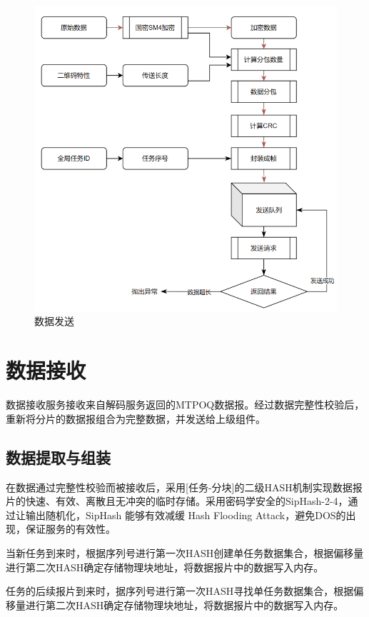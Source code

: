 \begin{figure}[!htbp]
\centering
\includegraphics[scale=1.2]{figures/QR_Enc_Flow.png}
\caption{数据发送}
\end{figure}

\section{数据接收}

数据接收服务接收来自解码服务返回的MTPOQ数据报。经过数据完整性校验后，重新将分片的数据报组合为完整数据，并发送给上级组件。

\subsection{数据提取与组装}

在数据通过完整性校验而被接收后，采用[任务-分块]的二级HASH机制实现数据报片的快速、有效、离散且无冲突的临时存储。采用密码学安全的SipHash-2-4，通过让输出随机化，SipHash 能够有效减缓 Hash Flooding Attack，避免DOS的出现，保证服务的有效性。

当新任务到来时，根据序列号进行第一次HASH创建单任务数据集合，根据偏移量进行第二次HASH确定存储物理块地址，将数据报片中的数据写入内存。

任务的后续报片到来时，据序列号进行第一次HASH寻找单任务数据集合，根据偏移量进行第二次HASH确定存储物理块地址，将数据报片中的数据写入内存。

